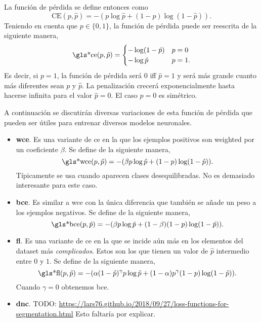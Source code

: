 La función de pérdida se define entonces como
\begin{equation}
  \text{CE}(p, \hat{p}) = -(p\log\hat{p} + (1 - p)\log(1 - \hat{p})).
\end{equation}
Teniendo en cuenta que \(p \in \{0, 1\}\), la función de pérdida puede ser
reescrita de la siguiente manera,
\begin{equation}
  \text{\gls*{ce}}(p, \hat{p}) =
  \begin{cases}
    -\log(1 - \hat{p}) & p = 0 \\
    -\log\hat{p} & p = 1.
  \end{cases}
\end{equation}
Es decir, si \(p = 1\), la función de pérdida será \(0\) \gls{iff} \(\hat{p} =
1\) y será más grande cuanto más diferentes sean \(p\) y \(\hat{p}\). La
penalización crecerá exponencialmente hasta hacerse infinita para el valor
\(\hat{p} = 0\). El caso \(p = 0\) es simétrico.

A continuación se discutirán diversas variaciones de esta función de pérdida
que pueden ser útiles para entrenar diversos modelos neuronales.

\begin{itemize}
  \item \textbf{\gls*{wce}}. Es una variante de \gls{ce} en la que los ejemplos
  positivos son weighted por un coeficiente \(\beta\). Se define de la
  siguiente manera,
  \begin{equation}
    \text{\gls*{wce}}(p, \hat{p}) =
    -(\beta p\log\hat{p} + (1 - p)\log(1 - \hat{p})).
  \end{equation}
  Típicamente se usa cuando aparecen clases desequilibradas. No es demasiado
  interesante para este caso.
  \item \textbf{\gls*{bce}}. Es similar a \gls{wce} con la única diferencia que
  también se añade un peso a los ejemplos negativos. Se define de la siguiente
  manera,
  \begin{equation}
    \text{\gls*{bce}}(p, \hat{p}) =
    -(\beta p\log\hat{p} + (1 - \beta)(1 - p)\log(1 - \hat{p})).
  \end{equation}
  \item \textbf{\gls*{fl}}. Es una variante de \gls{ce} en la que se incide aún
  más en los elementos del dataset más \emph{complicados}. Estos son los que
  tienen un valor de \(\hat{p}\) intermedio entre \(0\) y \(1\). Se define de
  la siguiente manera,
  \begin{equation}
    \text{\gls*{fl}}(p, \hat{p}) =
    -(\alpha (1 - \hat{p})^\gamma p\log\hat{p} +
    (1 - \alpha)p^\gamma (1 - p)\log(1 - \hat{p})).
  \end{equation}
  Cuando \(\gamma = 0\) obtenemos \gls{bce}.
  \item \textbf{\gls*{dnc}}. TODO:
  \url{https://lars76.github.io/2018/09/27/loss-functions-for-segmentation.html} Esto
  faltaría por explicar.
\end{itemize}


